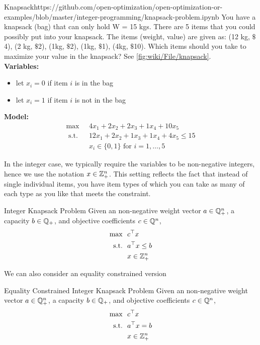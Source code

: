 \begin{examplewithcode}{Knapsack}{https://github.com/open-optimization/open-optimization-or-examples/blob/master/integer-programming/knapsack-problem.ipynb}
\label{example:knapsack}
You have a knapsack (bag) that can only hold W = 15 kgs.  There are 5 items that you could possibly put into your knapsack.  The items (weight, value) are given as:
(12 kg, $\$$4), (2 kg, $\$$2), (1kg, $\$$2), (1kg, $\$$1), (4kg, $\$$10).  Which items should you take to maximize your value in the knapsack? See \autoref{fig:wiki/File/knapsack}.\\

\noindent \textbf{Variables:}
\begin{itemize}
\item let $x_i = 0$ if item $i$ is in the bag
\item let $x_i = 1$ if item $i$ is not in the bag
\end{itemize}
\textbf{Model:}
\begin{align}
\max  \  \ &4 x_1 + 2 x_2 + 2 x_3 + 1 x_4 + 10 x_5 \tag{Total value}\\
\text{ s.t. }\ \ &  12 x_1 + 2 x_2 + 1 x_3 + 1 x_4 + 4 x_5 \leq 15 \tag{Capacity bound}\\
& x_i \in \{0,1\} \text{ for } i=1, \dots, 5 \tag{Item taken or not}
\end{align}
\end{examplewithcode}
In the integer case, we typically require the variables to be non-negative integers, hence we use the notation $x \in {\mathbb{Z}}^n_+$.  This setting reflects the fact that instead of single individual items, you have item types of which you can take as many of each type as you like that meets the constraint.
\begin{general}{Integer Knapsack Problem}{\npcomplete}
Given an non-negative weight vector $a \in {\mathbb{Q}}^n_+$, a capacity $b \in {\mathbb{Q}}_+$, and objective coefficients $c \in {\mathbb{Q}}^n$, 
\begin{equation}
\begin{split}
\max \ \ & c^\top x\\
\mbox{s.t.}\ \ & a^\top x \leq b\\
& x \in {\mathbb{Z}}^n_+
\end{split}
\end{equation}
\end{general}
We can also consider an equality constrained version
\begin{general}{Equality Constrained Integer Knapsack Problem}{\nphard}
Given an non-negative weight vector $a \in {\mathbb{Q}}^n_+$, a capacity $b \in {\mathbb{Q}}_+$, and objective coefficients $c \in {\mathbb{Q}}^n$, 
\begin{align}
\max \ \ & c^\top x\\
\mbox{s.t.}\ \ & a^\top x = b\\
& x \in {\mathbb{Z}}^n_+
\end{align}
\end{general}
